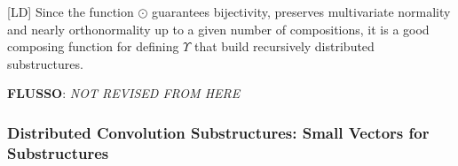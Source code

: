 \documentclass[twoside,11pt]{article}
\def\smallvectors#1{\mathcal{#1}}
\def\df{\Upsilon}
\def\mo{\odot}
\def\meta#1{\noindent\textbf{FLUSSO}: \emph{#1}}
\def\mysecondremove#1{}
\def\mysecondinsert#1{#1}
\def\LD#1{[{\color{blue}L}D] {\color{blue}#1}}
\begin{document}







\LD{Since the function $\mo$ guarantees bijectivity, preserves multivariate normality and nearly orthonormality up to a given number of compositions, it is a good composing function for defining $\df$ that build recursively distributed substructures.}


\meta{NOT REVISED FROM HERE}

\subsubsection{Distributed Convolution Substructures: Small Vectors for Substructures}
\label{sec:compositional_definition}


\end{document}
